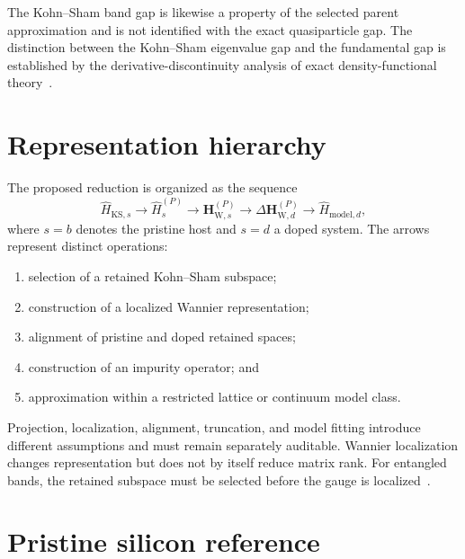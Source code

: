 
The Kohn--Sham band gap is likewise a property of the selected parent
approximation and is not identified with the exact quasiparticle gap. The
distinction between the Kohn--Sham eigenvalue gap and the fundamental gap is
established by the derivative-discontinuity analysis of exact
density-functional theory~\cite{perdewLevy1983,shamSchluter1983}.

\section{Representation hierarchy}

The proposed reduction is organized as the sequence
\begin{equation}
    \hat H_{\mathrm{KS},s}
    \longrightarrow
    \hat H_s^{(P)}
    \longrightarrow
    \mathbf H_{\mathrm W,s}^{(P)}
    \longrightarrow
    \Delta\mathbf H_{\mathrm W,d}^{(P)}
    \longrightarrow
    \hat H_{\mathrm{model},d},
\end{equation}
where $s=b$ denotes the pristine host and $s=d$ a doped system. The arrows
represent distinct operations:
\begin{enumerate}
    \item selection of a retained Kohn--Sham subspace;
    \item construction of a localized Wannier representation;
    \item alignment of pristine and doped retained spaces;
    \item construction of an impurity operator; and
    \item approximation within a restricted lattice or continuum model class.
\end{enumerate}

Projection, localization, alignment, truncation, and model fitting introduce
different assumptions and must remain separately auditable. Wannier
localization changes representation but does not by itself reduce matrix rank.
For entangled bands, the retained subspace must be selected before the gauge is
localized~\cite{marzari2012,souza2001}.

\section{Pristine silicon reference}


